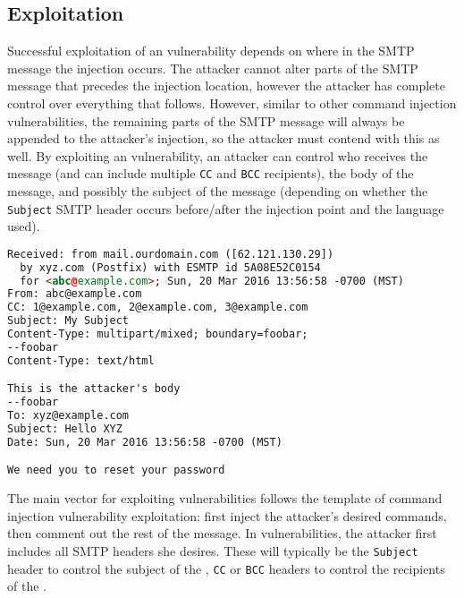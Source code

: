 \subsection{Exploitation}
\label{exploitation}
Successful exploitation of an \ehi vulnerability depends on where in
the SMTP message the injection occurs. The attacker cannot alter parts
of the SMTP message that precedes the injection location, however the
attacker has complete control over everything that follows. However,
similar to other command injection vulnerabilities, the remaining
parts of the SMTP message will always be appended to the attacker's
injection, so the attacker must contend with this as well. By
exploiting an \ehi vulnerability, an attacker can control who receives
the message (and can include multiple \texttt{CC} and \texttt{BCC}
recipients), the body of the message, and possibly the subject of the
message (depending on whether the \texttt{Subject} SMTP header occurs
before/after the injection point and the language used).

\begin{lstlisting}[language=HTML,caption={Exploiting the \ehi
      vulnerability in Listing~\ref{code:phpemi} to control the
      recipients, subject, and body of the SMTP message.},label={code:ehiexploit}, float]
Received: from mail.ourdomain.com ([62.121.130.29])
  by xyz.com (Postfix) with ESMTP id 5A08E52C0154
  for <abc@example.com>; Sun, 20 Mar 2016 13:56:58 -0700 (MST)
From: abc@example.com
CC: 1@example.com, 2@example.com, 3@example.com
Subject: My Subject
Content-Type: multipart/mixed; boundary=foobar;
--foobar
Content-Type: text/html

This is the attacker's body
--foobar
To: xyz@example.com
Subject: Hello XYZ
Date: Sun, 20 Mar 2016 13:56:58 -0700 (MST)

We need you to reset your password
\end{lstlisting}

The main vector for exploiting \ehi vulnerabilities follows the
template of command injection vulnerability exploitation: first inject
the attacker's desired commands, then comment out the rest of the
message. In \ehi vulnerabilities, the attacker first includes all SMTP
headers she desires. These will typically be the \texttt{Subject}
header to control the subject of the \email\footnotemark, \texttt{CC}
or \texttt{BCC} headers to control the recipients of the \email.


